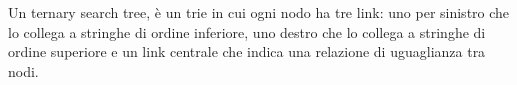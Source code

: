 \documentclass{subfiles}
\begin{document}
Un ternary search tree, è un trie in cui ogni nodo ha tre link: uno per sinistro che lo collega a stringhe di ordine inferiore,
uno destro che lo collega a stringhe di ordine superiore e un link centrale che indica una relazione di uguaglianza tra nodi.
\end{document}
